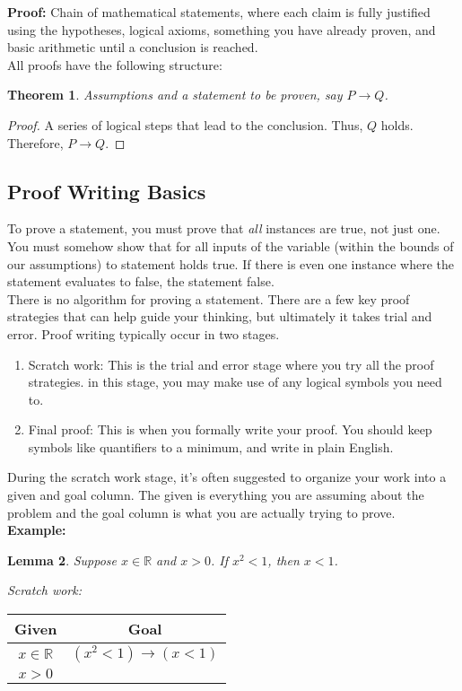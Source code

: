 \documentclass{article}
\newtheorem{theorem}{Theorem}[section]
\newtheorem{lemma}[theorem]{Lemma}
\begin{document}
\noindent \textbf{Proof:} Chain of mathematical statements, where each claim is fully
justified using the hypotheses, logical axioms, something you have already proven, and
basic arithmetic until a conclusion is reached. \\

\noindent All proofs have the following structure:
\begin{theorem}
    Assumptions and a statement to be proven, say $P \rightarrow Q$.
\end{theorem}
\begin{proof}
    A series of logical steps that lead to the conclusion.
    Thus, $Q$ holds. Therefore, $P \rightarrow Q$.
\end{proof}

\subsection{Proof Writing Basics}
To prove a statement, you must prove that \textit{all} instances
are true, not just one. You must somehow show that for all inputs of the variable (within
the bounds of our assumptions) to statement holds true. If there is even one instance where
the statement evaluates to false, the statement false. \\ 

\noindent There is no algorithm for proving a statement. There are a few key proof strategies
that can help guide your thinking, but ultimately it takes trial and error. Proof writing
typically occur in two stages.
\begin{enumerate}
    \item Scratch work: This is the trial and error stage where you try all the proof strategies.
    in this stage, you may make use of any logical symbols you need to.
    \item Final proof: This is when you formally write your proof. You should keep symbols like
    quantifiers to a minimum, and write in plain English.
\end{enumerate}

\noindent During the scratch work stage, it's often suggested to organize your work into a given and goal
column. The given is everything you are assuming about the problem and the goal column is what you
are actually trying to prove. \\

\noindent \textbf{Example:}
\begin{lemma}
    Suppose $x \in \mathbb{R}$ and $x > 0$. If $x^2 < 1$, then $x < 1$.
\end{lemma}
\textit{Scratch work:}
\begin{center}
\begin{tabular}{c | c}
    Given & Goal \\
    \hline
    $x \in \mathbb{R}$ & $(x^2 < 1) \rightarrow (x < 1)$ \\
    $x > 0$ & \\
\end{tabular}
\end{center}
\end{document}
